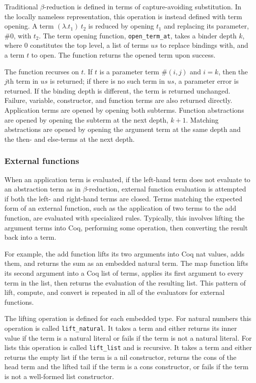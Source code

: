 \documentclass[12pt]{article}
\begin{document}
Traditional $\beta$-reduction is defined in terms of capture-avoiding
substitution.  In the locally nameless representation, this operation is
instead defined with term opening.  A term $(\lambda. t_1)\ t_2$ is
reduced by opening $t_1$ and replacing its parameter, $\#0$, with $t_2$.
The term opening function, \texttt{open\_term\_at}, takes a binder
depth $k$, where 0 constitutes the top level, a list of terms $us$ to
replace bindings with, and a term $t$ to open. The function returns the
opened term upon success.

The function recurses on $t$.  If $t$ is a parameter term $\#(i, j)$ and
$i = k$, then the $j$th term in $us$ is returned; if there is no such
term in $us$, a parameter error is returned.  If the binding depth is
different, the term is returned unchanged.  Failure, variable,
constructor, and function terms are also returned directly.  Application
terms are opened by opening both subterms.  Function abstractions are
opened by opening the subterm at the next depth, $k + 1$.  Matching
abstractions are opened by opening the argument term at the same depth
and the then- and else-terms at the next depth.

\subsubsection{External functions}

When an application term is evaluated, if the left-hand term does not
evaluate to an abstraction term as in $\beta$-reduction, external
function evaluation is attempted if both the left- and right-hand terms
are closed.  Terms matching the expected form of an external function,
such as the application of two terms to the add function, are evaluated
with specialized rules.  Typically, this involves lifting the argument
terms into Coq, performing some operation, then converting the result
back into a term.

For example, the add function lifts its two arguments into Coq nat
values, adds them, and returns the sum as an embedded natural term.  The
map function lifts its second argument into a Coq list of terms, applies
its first argument to every term in the list, then returns the
evaluation of the resulting list.  This pattern of lift, compute, and
convert is repeated in all of the evaluators for external functions.

The lifting operation is defined for each embedded type.  For natural
numbers this operation is called \texttt{lift\_natural}.  It takes a
term and either returns its inner value if the term is a natural literal
or fails if the term is not a natural literal.  For lists this operation
is called \texttt{lift\_list} and is recursive.  It takes a term and
either returns the empty list if the term is a nil constructor, returns
the cons of the head term and the lifted tail if the term is a cons
constructor, or fails if the term is not a well-formed list constructor.
\end{document}
